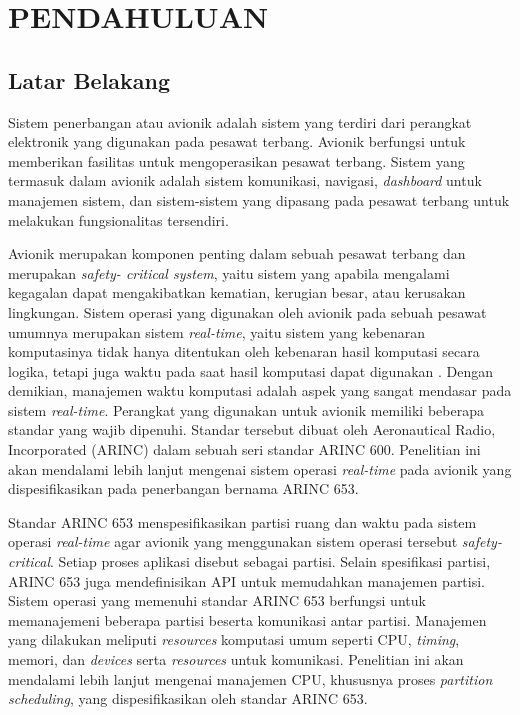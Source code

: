 \chapter{PENDAHULUAN}

\section{Latar Belakang}

Sistem penerbangan atau avionik adalah sistem yang terdiri dari perangkat elektronik yang
digunakan pada pesawat terbang. Avionik berfungsi untuk memberikan fasilitas untuk
mengoperasikan pesawat terbang. Sistem yang termasuk dalam avionik adalah sistem komunikasi,
navigasi, \textit{dashboard} untuk manajemen sistem, dan sistem-sistem yang dipasang pada
pesawat terbang untuk melakukan fungsionalitas tersendiri.

Avionik merupakan komponen penting dalam sebuah pesawat terbang dan merupakan \textit{safety\hyp
critical system}, yaitu sistem yang apabila mengalami kegagalan dapat mengakibatkan kematian,
kerugian besar, atau kerusakan lingkungan.  Sistem operasi yang digunakan oleh avionik pada
sebuah pesawat umumnya merupakan sistem \textit{real-time}, yaitu sistem yang kebenaran
komputasinya tidak hanya ditentukan oleh kebenaran hasil komputasi secara logika, tetapi juga
waktu pada saat hasil komputasi dapat digunakan \citep[p.~6]{Shin1994}. Dengan demikian,
manajemen waktu komputasi adalah aspek yang sangat mendasar pada sistem \textit{real-time}.
Perangkat yang digunakan untuk avionik memiliki beberapa standar yang wajib dipenuhi. Standar
tersebut dibuat oleh Aeronautical Radio, Incorporated (ARINC) dalam sebuah seri standar ARINC
600. Penelitian ini akan mendalami lebih lanjut mengenai sistem operasi \textit{real-time} pada
avionik yang dispesifikasikan pada penerbangan bernama ARINC 653.

Standar ARINC 653 menspesifikasikan partisi ruang dan waktu pada sistem operasi
\textit{real-time} agar avionik yang menggunakan sistem operasi tersebut
\textit{safety-critical}. Setiap proses aplikasi disebut sebagai partisi.  Selain spesifikasi
partisi, ARINC 653 juga mendefinisikan API untuk memudahkan manajemen partisi.  Sistem operasi
yang memenuhi standar ARINC 653 berfungsi untuk memanajemeni beberapa partisi beserta komunikasi
antar partisi.  Manajemen yang dilakukan meliputi \textit{resources} komputasi umum seperti CPU,
\textit{timing}, memori, dan \textit{devices} serta \textit{resources} untuk komunikasi.
Penelitian ini akan mendalami lebih lanjut mengenai manajemen CPU, khususnya proses
\textit{partition scheduling}, yang dispesifikasikan oleh standar ARINC 653.


